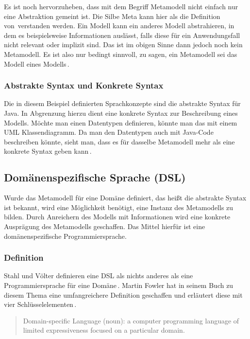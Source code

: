 \documentclass[12pt,oneside,a4paper,parskip]{scrbook}
\begin{document}
Es ist noch hervorzuheben, dass mit dem Begriff Metamodell nicht einfach nur eine Abstraktion gemeint ist. Die Silbe Meta kann hier als \glqq die Definition von\grqq\ verstanden werden. Ein Modell kann ein anderes Modell abstrahieren, in dem es beispielsweise Informationen auslässt, falls diese für ein Anwendungsfall nicht relevant oder implizit sind. Das ist im obigen Sinne dann jedoch noch kein Metamodell. Es ist also nur bedingt sinnvoll, zu sagen, ein Metamodell sei das Modell eines Modells\,\cite[S.\,27]{voelter2013}.

\subsubsection{Abstrakte Syntax und Konkrete Syntax}

Die in diesem Beispiel definierten Sprachkonzepte sind die abstrakte Syntax für Java. In Abgrenzung hierzu dient eine konkrete Syntax zur Beschreibung eines Modells. Möchte man einen Datentypen definieren, könnte man das mit einem UML Klassendiagramm. Da man den Datentypen auch mit Java-Code beschreiben könnte, sieht man, dass es für dasselbe Metamodell mehr als eine konkrete Syntax geben kann\,\cite[S.\,59f.]{stahl2007}.

\subsection{Domänenspezifische Sprache (DSL)}

Wurde das Metamodell für eine Domäne definiert, das heißt die abstrakte Syntax ist bekannt, wird eine Möglichkeit benötigt, eine Instanz des Metamodells zu bilden. Durch Anreichern des Modells mit Informationen wird eine konkrete Ausprägung des Metamodells geschaffen. Das Mittel hierfür ist eine domänenspezifische Programmiersprache.

\subsubsection{Definition}

Stahl und Völter definieren eine DSL als \glqq [...] nichts anderes als eine Programmiersprache für eine Domäne\grqq\,\cite[S.\,30]{stahl2007}. Martin Fowler hat in seinem Buch zu diesem Thema eine umfangreichere Definition geschaffen und erläutert diese mit vier Schlüsselelementen\,\cite[S.\,27f.]{fowler2010}.

\begin{quote}\glqq Domain-specific Language (noun): a computer programming language of limited expressiveness focused on a particular domain.\grqq \end{quote}
\end{document}
